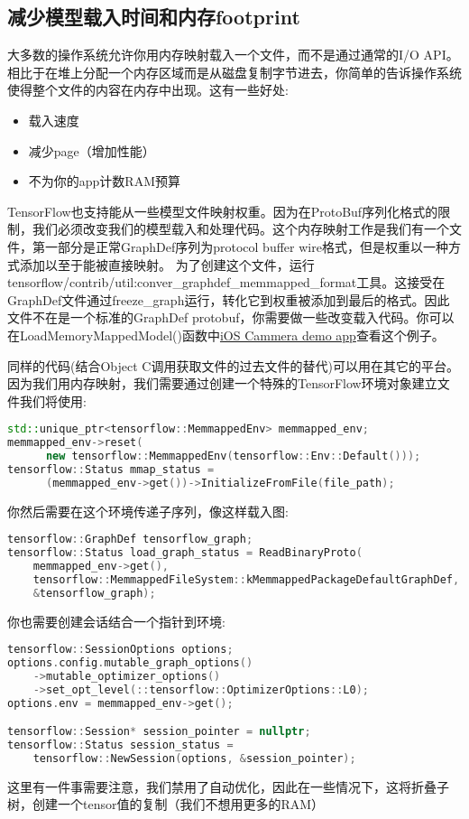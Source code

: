 \subsection{减少模型载入时间和内存footprint}
大多数的操作系统允许你用内存映射载入一个文件，而不是通过通常的I/O API。相比于在堆上分配一个内存区域而是从磁盘复制字节进去，你简单的告诉操作系统使得整个文件的内容在内存中出现。这有一些好处:
\begin{itemize}
\item 载入速度
\item 减少page（增加性能）
\item 不为你的app计数RAM预算
\end{itemize}
TensorFlow也支持能从一些模型文件映射权重。因为在ProtoBuf序列化格式的限制，我们必须改变我们的模型载入和处理代码。这个内存映射工作是我们有一个文件，第一部分是正常GraphDef序列为protocol buffer wire格式，但是权重以一种方式添加以至于能被直接映射。
为了创建这个文件，运行tensorflow/contrib/util:conver\_graphdef\_memmapped\_format工具。这接受在GraphDef文件通过freeze\_graph运行，转化它到权重被添加到最后的格式。因此文件不在是一个标准的GraphDef protobuf，你需要做一些改变载入代码。你可以在LoadMemoryMappedModel()函数中\href{https://www.github.com/tensorflow/tensorflow/blob/r1.4/tensorflow/examples/ios/camera/tensorflow_utils.mm?l=147}{iOS Cammera demo app}查看这个例子。

同样的代码(结合Object C调用获取文件的过去文件的替代)可以用在其它的平台。因为我们用内存映射，我们需要通过创建一个特殊的TensorFlow环境对象建立文件我们将使用:
\begin{lstlisting}[language=C++]
std::unique_ptr<tensorflow::MemmappedEnv> memmapped_env;
memmapped_env->reset(
      new tensorflow::MemmappedEnv(tensorflow::Env::Default()));
tensorflow::Status mmap_status =
      (memmapped_env->get())->InitializeFromFile(file_path);
\end{lstlisting}
你然后需要在这个环境传递子序列，像这样载入图:
\begin{lstlisting}[language=C++]
tensorflow::GraphDef tensorflow_graph;
tensorflow::Status load_graph_status = ReadBinaryProto(
    memmapped_env->get(),
    tensorflow::MemmappedFileSystem::kMemmappedPackageDefaultGraphDef,
    &tensorflow_graph);
\end{lstlisting}
你也需要创建会话结合一个指针到环境:
\begin{lstlisting}[language=C++]
tensorflow::SessionOptions options;
options.config.mutable_graph_options()
    ->mutable_optimizer_options()
    ->set_opt_level(::tensorflow::OptimizerOptions::L0);
options.env = memmapped_env->get();

tensorflow::Session* session_pointer = nullptr;
tensorflow::Status session_status =
    tensorflow::NewSession(options, &session_pointer);
\end{lstlisting}
这里有一件事需要注意，我们禁用了自动优化，因此在一些情况下，这将折叠子树，创建一个tensor值的复制（我们不想用更多的RAM）

